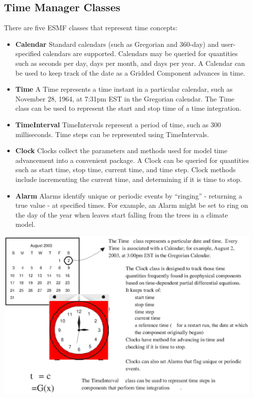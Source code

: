 \subsection{Time Manager Classes}
There are five ESMF classes that represent time concepts:
\begin{itemize}
\item {\bf Calendar}  Standard calendars (such as Gregorian 
and 360-day) and user-specified calendars are supported.  
Calendars may be queried for quantities such as seconds per day, 
days per month, and days per year.  A Calendar can be 
used to keep track of the date as a Gridded Component advances 
in time. 
\item {\bf Time} A Time represents a time instant in a particular
calendar, such as November 28, 1964, at 7:31pm EST in the Gregorian 
calendar.  The Time class can be used 
to represent the start and stop time of a time integration.
\item {\bf TimeInterval} TimeIntervals represent a period 
of time, such as 300 milliseconds.  Time steps can be represented 
using TimeIntervals.  
\item {\bf Clock} Clocks collect the parameters and 
methods used for model time advancement into a convenient 
package.  A Clock can be queried for quantities such
as start time, stop time, current time, and time step.  Clock
methods include incrementing the current time, and determining
if it is time to stop.  
\item {\bf Alarm} Alarms identify unique or periodic events
by ``ringing'' - returning a true value - at specified times.  
For example, an Alarm might be set to ring on the day of the 
year when leaves start falling from the trees in a climate model.
\end{itemize}

\begin{center}
\includegraphics*{TimeMgr_desc.eps}
\end{center}

